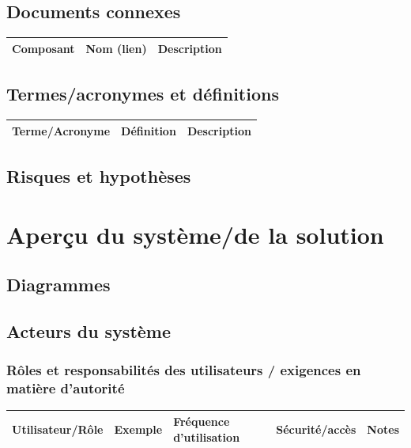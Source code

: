 \documentclass[a4paper,12pt]{report}  %
\begin{document}
	\subsection{Documents connexes}
	\begin{longtable}{|l|l|l|}
		\hline
		\textbf{Composant} & \textbf{Nom (lien)} & \textbf{Description} \\
		\hline
	\end{longtable}
	
	\subsection{Termes/acronymes et définitions}
	\lipsum[5]
	\begin{longtable}{|l|l|l|}
		\hline
		\textbf{Terme/Acronyme} & \textbf{Définition} & \textbf{Description} \\
		\hline
	\end{longtable}
	
	\subsection{Risques et hypothèses}
	\lipsum[6]
	
	\pagebreak
	
	\section{Aperçu du système/de la solution}
	\lipsum[7]
	
	\subsection{Diagrammes}
	\lipsum[8]
	
	\subsection{Acteurs du système}
	\subsubsection{Rôles et responsabilités des utilisateurs / exigences en matière d'autorité}
	\lipsum[9]
	\begin{longtable}{|l|l|l|l|l|}
		\hline
		\textbf{Utilisateur/Rôle} & \textbf{Exemple} & \textbf{Fréquence d'utilisation} & \textbf{Sécurité/accès} & \textbf{Notes} \\
		\hline
	\end{longtable}
	
\end{document}
